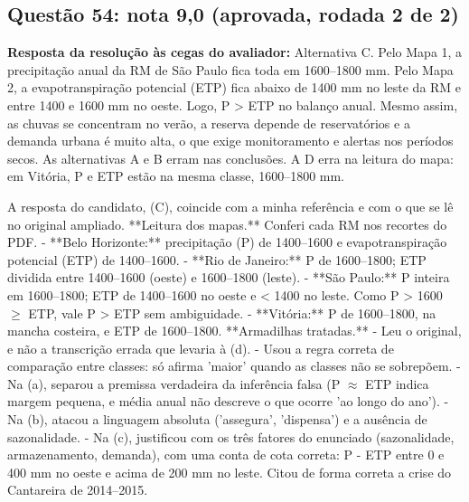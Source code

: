 \documentclass{article}%
\begin{document}
\subsection*{Questão 54: nota 9,0 (aprovada, rodada 2 de 2)}%
\textbf{Resposta da resolução às cegas do avaliador:} Alternativa C. Pelo Mapa 1, a precipitação anual da RM de São Paulo fica toda em 1600--1800 mm. Pelo Mapa 2, a evapotranspiração potencial (ETP) fica abaixo de 1400 mm no leste da RM e entre 1400 e 1600 mm no oeste. Logo, P > ETP no balanço anual. Mesmo assim, as chuvas se concentram no verão, a reserva depende de reservatórios e a demanda urbana é muito alta, o que exige monitoramento e alertas nos períodos secos. As alternativas A e B erram nas conclusões. A D erra na leitura do mapa: em Vitória, P e ETP estão na mesma classe, 1600--1800 mm.\par %
A resposta do candidato, (C), coincide com a minha referência e com o que se lê no original ampliado.\newline%
\newline%
**Leitura dos mapas.** Conferi cada RM nos recortes do PDF.\newline%
{-} **Belo Horizonte:** precipitação (P) de 1400--1600 e evapotranspiração potencial (ETP) de 1400--1600.\newline%
{-} **Rio de Janeiro:** P de 1600--1800; ETP dividida entre 1400--1600 (oeste) e 1600--1800 (leste).\newline%
{-} **São Paulo:** P inteira em 1600--1800; ETP de 1400--1600 no oeste e < 1400 no leste. Como P > 1600 $\geq$ ETP, vale P > ETP sem ambiguidade.\newline%
{-} **Vitória:** P de 1600--1800, na mancha costeira, e ETP de 1600--1800.\newline%
\newline%
**Armadilhas tratadas.**\newline%
{-} Leu o original, e não a transcrição errada que levaria à (d).\newline%
{-} Usou a regra correta de comparação entre classes: só afirma 'maior' quando as classes não se sobrepõem.\newline%
{-} Na (a), separou a premissa verdadeira da inferência falsa (P $\approx$ ETP indica margem pequena, e média anual não descreve o que ocorre 'ao longo do ano').\newline%
{-} Na (b), atacou a linguagem absoluta ('assegura', 'dispensa') e a ausência de sazonalidade.\newline%
{-} Na (c), justificou com os três fatores do enunciado (sazonalidade, armazenamento, demanda), com uma conta de cota correta: P - ETP entre 0 e 400 mm no oeste e acima de 200 mm no leste. Citou de forma correta a crise do Cantareira de 2014--2015.\newline%
\end{document}

